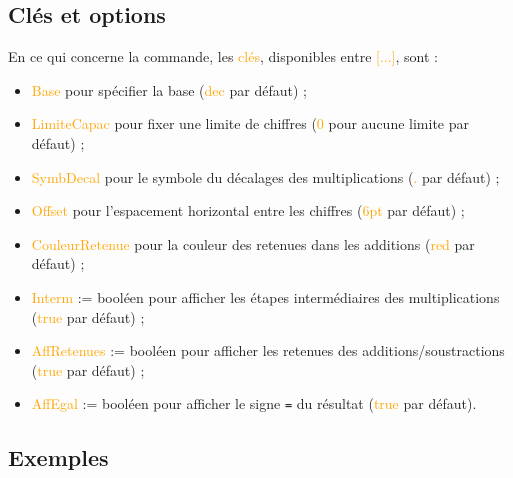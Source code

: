 \documentclass[french,a4paper,11pt]{article}
\newcommand\Cle[1]{{\small\sffamily\textlangle \textcolor{orange}{#1}\textrangle}}
\begin{document}
{{\begin{DemoCode}
\end{DemoCode}

\begin{DemoCode}[]
\end{DemoCode}

\begin{DemoCode}[]
\end{DemoCode}

\begin{DemoCode}[]
\end{DemoCode}

\subsection{Clés et options}

\begin{cautionblock}
En ce qui concerne la commande, les \Cle{clés}, disponibles entre \Cle{[...]}, sont :

\begin{itemize}
	\item \Cle{Base} pour spécifier la base (\Cle{dec} par défaut) ;
	\item \Cle{LimiteCapac} pour fixer une limite de chiffres (\Cle{0} pour aucune limite par défaut) ;
	\item \Cle{SymbDecal} pour le symbole du décalages des multiplications (\Cle{.} par défaut) ;
	\item \Cle{Offset} pour l'espacement horizontal entre les chiffres (\Cle{6pt} par défaut) ;
	\item \Cle{CouleurRetenue} pour la couleur des retenues dans les additions (\Cle{red} par défaut) ;
	\item \Cle{Interm} := booléen pour afficher les étapes intermédiaires des multiplications (\Cle{true} par défaut) ;
	\item \Cle{AffRetenues} := booléen pour afficher les retenues des additions/soustractions (\Cle{true} par défaut) ;
	\item \Cle{AffEgal} := booléen pour afficher le signe \texttt{=} du résultat (\Cle{true} par défaut).
\end{itemize}
\end{cautionblock}

\subsection{Exemples}

}}
\end{document}

